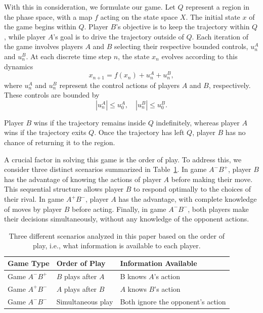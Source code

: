 With this in consideration, we formulate our game. Let $Q$ represent a region in the phase space, with a map $f$ acting on the state space $X$. The initial state $x$ of the game begins within $Q$. Player $B$'s objective is to keep the trajectory within $Q$, while player $A$'s goal is to drive the trajectory outside of $Q$. Each iteration of the game involves players $A$ and $B$ selecting their respective bounded controls, $u_n^A$ and $u_n^B$. At each discrete time step $n$, the state $x_n$ evolves according to this dynamics
\begin{equation}
    x_{n+1} = f(x_n) + u_n^A + u_n^B,
\end{equation}
where $u_n^A $ and $u_n^B $ represent the control actions of players $A$ and $B$, respectively. These controls are bounded by
\begin{equation}
    |u_n^A| \leq u_0^A, \quad |u_n^B| \leq u_0^B.
\end{equation}


Player $B$ wins if the trajectory remains inside $Q$ indefinitely, whereas player $A$ wins if the trajectory exits $Q$. Once the trajectory has left $Q$, player $B$ has no chance of returning it to the region.

A crucial factor in solving this game is the order of play. To address this, we consider three distinct scenarios summarized in Table~\ref{tab:games}. In game $A^{-}B^{+}$, player $B$ has the advantage of knowing the actions of player $A$ before making their move. This sequential structure allows player $B$ to respond optimally to the choices of their rival. In game $A^{+}B^{-}$, player $A$ has the advantage, with complete knowledge of moves by player $B$ before acting. Finally, in game $A^{-}B^{-}$, both players make their decisions simultaneously, without any knowledge of the opponent actions.  



\begin{table}[h!]
\centering
\begin{tabular}{|p{3cm}|p{4cm}|p{7.3cm}|}
\hline
\textbf{Game Type} & \textbf{Order of Play} & \textbf{Information Available} \\
\hline
Game $A^{-}B^{+}$ & $B$ plays after $A$ & B knows $A$'s action  \\
\hline
Game $A^{+}B^{-}$ & $A$ plays after $B$ & $A$ knows $B$'s action  \\
\hline
Game $A^{-}B^{-}$ & Simultaneous play & Both ignore the opponent's action  \\
\hline
\end{tabular}
\caption{Three different scenarios analyzed in this paper based on the order of play, i.e., what information is available to each player.}
\label{tab:games}
\end{table}











